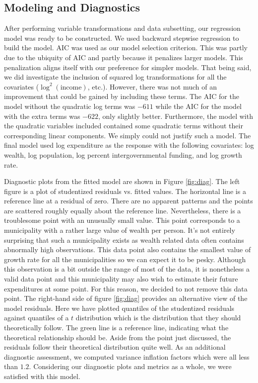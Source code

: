 \documentclass{article}\usepackage[]{graphicx}\usepackage[]{color}
\begin{document}
\subsection{Modeling and Diagnostics} \label{modeling}

After performing variable transformations and data subsetting, our regression model was ready to be constructed. We used backward stepwise regression to build the model. AIC was used as our model selection criterion. This was partly due to the ubiquity of AIC and partly because it penalizes larger models. This penalization aligns itself with our preference for simpler models. That being said, we did investigate the inclusion of squared log transformations for all the covariates ($\log^2(\text{income})$, etc.). However, there was not much of an improvement that could be gained by including these terms. The AIC for the model without the quadratic log terms was $-611$ while the AIC for the model with the extra terms was $-622$, only slightly better. Furthermore, the model with the quadratic variables included contained some quadratic terms without their corresponding linear components. We simply could not justify such a model. The final model used log expenditure as the response with the following covariates: log wealth, log population, log percent intergovernmental funding, and log growth rate.



Diagnostic plots from the fitted model are shown in Figure \ref{fig:diag}. The left figure is a plot of studentized residuals vs. fitted values. The horizontal line is a reference line at a residual of zero. There are no apparent patterns and the points are scattered roughly equally about the reference line. Nevertheless, there is a troublesome point with an unusually small value. This point corresponds to a municipality with a rather large value of wealth per person. It's not entirely surprising that such a municipality exists as wealth related data often contains abnormally high observations. This data point also contains the smallest value of growth rate for all the municipalities so we can expect it to be pesky. Although this observation is a bit outside the range of most of the data, it is nonetheless a valid data point and this municipality may also wish to estimate their future expenditures at some point. For this reason, we decided to not remove this data point. The right-hand side of figure \ref{fig:diag} provides an alternative view of the model residuals. Here we have plotted quantiles of the studentized residuals against quantiles of a $t$ distribution which is the distribution that they should theoretically follow. The green line is a reference line, indicating what the theoretical relationship should be. Aside from the point just discussed, the residuals follow their theoretical distribution quite well. As an additional diagnostic assessment, we computed variance inflation factors which were all less than $1.2$. Considering our diagnostic plots and metrics as a whole, we were satisfied with this model.
\end{document}
